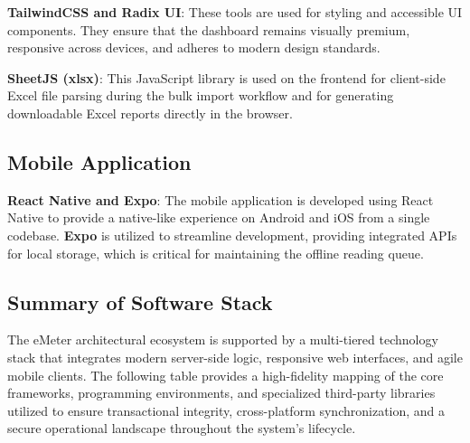 \documentclass[12pt, a4paper, onecolumn]{report}
\begin{document}
\textbf{TailwindCSS and Radix UI}: These tools are used for styling and accessible UI components. They ensure that the dashboard remains visually premium, responsive across devices, and adheres to modern design standards.

\textbf{SheetJS (xlsx)}: This JavaScript library is used on the frontend for client-side Excel file parsing during the bulk import workflow and for generating downloadable Excel reports directly in the browser.

\subsection{Mobile Application}
\textbf{React Native and Expo}: The mobile application is developed using React Native to provide a native-like experience on Android and iOS from a single codebase. \textbf{Expo} is utilized to streamline development, providing integrated APIs for local storage, which is critical for maintaining the offline reading queue.

\subsection{Summary of Software Stack}

The eMeter architectural ecosystem is supported by a multi-tiered technology stack that integrates modern server-side logic, responsive web interfaces, and agile mobile clients. The following table provides a high-fidelity mapping of the core frameworks, programming environments, and specialized third-party libraries utilized to ensure transactional integrity, cross-platform synchronization, and a secure operational landscape throughout the system's lifecycle.
\end{document}
